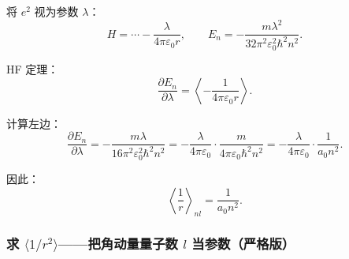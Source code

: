 \begin{derivationbox}[HF 一步出结果]
将 $e^2$ 视为参数 $\lambda$：
\[
H = \cdots - \frac{\lambda}{4\pi\varepsilon_0 r}, \qquad E_n = -\frac{m\lambda^2}{32\pi^2\varepsilon_0^2\hbar^2 n^2}.
\]

HF 定理：
\[
\frac{\partial E_n}{\partial \lambda} = \left\langle -\frac{1}{4\pi\varepsilon_0 r}\right\rangle.
\]

计算左边：
\[
\frac{\partial E_n}{\partial \lambda} = -\frac{m\lambda}{16\pi^2\varepsilon_0^2\hbar^2 n^2} = -\frac{\lambda}{4\pi\varepsilon_0} \cdot \frac{m}{4\pi\varepsilon_0\hbar^2 n^2} = -\frac{\lambda}{4\pi\varepsilon_0} \cdot \frac{1}{a_0 n^2}.
\]

因此：
\[
\boxed{\left\langle \frac{1}{r}\right\rangle_{nl} = \frac{1}{a_0 n^2}}.
\]
\end{derivationbox}

\subsubsection{求 $\langle 1/r^2\rangle$——把角动量量子数 $l$ 当参数（严格版）}

